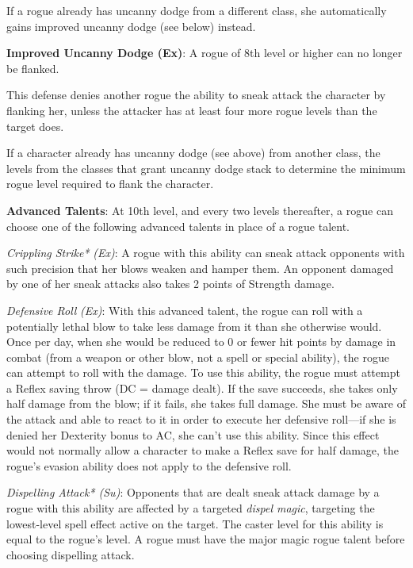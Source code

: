 If a rogue already has uncanny dodge from a different class, she automatically gains improved uncanny dodge (see below) instead.
				
\textbf{Improved Uncanny Dodge (Ex)}: A rogue of 8th level or higher can no longer be flanked.
				
This defense denies another rogue the ability to sneak attack the character by flanking her, unless the attacker has at least four more rogue levels than the target does.
				
If a character already has uncanny dodge (see above) from another class, the levels from the classes that grant uncanny dodge stack to determine the minimum rogue level required to flank the character.
				
\textbf{Advanced Talents}: At 10th level, and every two levels thereafter, a rogue can choose one of the following advanced talents in place of a rogue talent.
				
\textit{Crippling Strike*} \textit{(Ex)}: A rogue with this ability can sneak attack opponents with such precision that her blows weaken and hamper them. An opponent damaged by one of her sneak attacks also takes 2 points of Strength damage.
				
\textit{Defensive Roll} \textit{(Ex)}: With this advanced talent, the rogue can roll with a potentially lethal blow to take less damage from it than she otherwise would. Once per day, when she would be reduced to 0 or fewer hit points by damage in combat (from a weapon or other blow, not a spell or special ability), the rogue can attempt to roll with the damage. To use this ability, the rogue must attempt a Reflex saving throw (DC = damage dealt). If the save succeeds, she takes only half damage from the blow; if it fails, she takes full damage. She must be aware of the attack and able to react to it in order to execute her defensive roll---if she is denied her Dexterity bonus to AC, she can't use this ability. Since this effect would not normally allow a character to make a Reflex save for half damage, the rogue's evasion ability does not apply to the defensive roll.
				
\textit{Dispelling Attack* (Su)}: Opponents that are dealt sneak attack damage by a rogue with this ability are affected by a targeted \textit{dispel magic}, targeting the lowest-level spell effect active on the target. The caster level for this ability is equal to the rogue's level. A rogue must have the major magic rogue talent before choosing dispelling attack.
				
